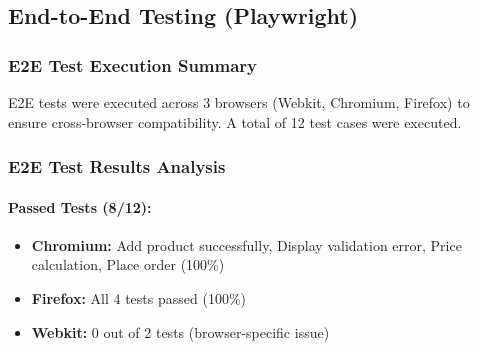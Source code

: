 \documentclass[11pt,a4paper]{article}
\begin{document}
\subsection{End-to-End Testing (Playwright)}

\subsubsection{E2E Test Execution Summary}

E2E tests were executed across 3 browsers (Webkit, Chromium, Firefox) to ensure cross-browser compatibility. A total of 12 test cases were executed.

\begin{table}[H]
\centering
\noindent{}
\caption{E2E Test Execution Summary}
\end{table}

\subsubsection{E2E Test Results Analysis}

\paragraph{Passed Tests (8/12):}
\begin{itemize}
    \item \checkmark \textbf{Chromium:} Add product successfully, Display validation error, Price calculation, Place order (100\%)
    \item \checkmark \textbf{Firefox:} All 4 tests passed (100\%)
    \item \checkmark \textbf{Webkit:} 0 out of 2 tests (browser-specific issue)
\end{itemize}
\end{document}
